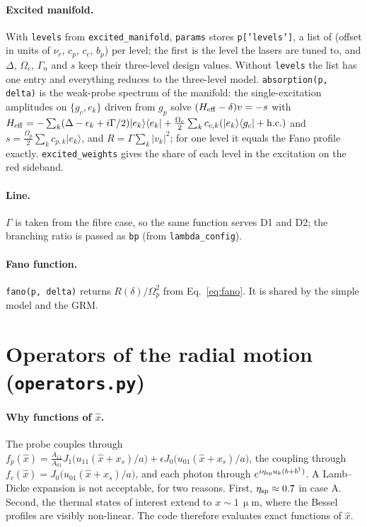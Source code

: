 \documentclass[11pt,a4paper]{article}
\newcommand{\ket}[1]{|#1\rangle}
\newcommand{\bra}[1]{\langle #1|}
\newcommand{\Om}{\Omega}
\newcommand{\code}[1]{\texttt{#1}}
\newcommand{\SI}[2]{\ensuremath{#1\,\mathrm{#2}}}
\begin{document}
\paragraph{Excited manifold.} With \code{levels} from \code{excited\_manifold}, \code{params} stores \code{p['levels']}, a list of (offset in units of $\nu_r$, $c_p$, $c_c$, $b_p$) per level; the first is the level the lasers are tuned to, and $\Delta$, $\Om_c$, $\Gamma_n$ and $s$ keep their three-level design values. Without \code{levels} the list has one entry and everything reduces to the three-level model. \code{absorption(p, delta)} is the weak-probe spectrum of the manifold: the single-excitation amplitudes on $\{g_c,e_k\}$ driven from $g_p$ solve $(H_{\rm eff}-\delta)v=-s$ with $H_{\rm eff}=-\sum_k(\Delta-\epsilon_k+i\Gamma/2)\ket{e_k}\bra{e_k}+\tfrac{\Om_c}2\sum_kc_{c,k}(\ket{e_k}\bra{g_c}+{\rm h.c.})$ and $s=\tfrac{\Om_p}2\sum_kc_{p,k}\ket{e_k}$, and $R=\Gamma\sum_k|v_k|^2$; for one level it equals the Fano profile exactly. \code{excited\_weights} gives the share of each level in the excitation on the red sideband.

\paragraph{Line.} $\Gamma$ is taken from the fibre case, so the same function serves D1 and D2; the branching ratio is passed as \code{bp} (from \code{lambda\_config}).

\paragraph{Fano function.} \code{fano(p, delta)} returns $R(\delta)/\Om_p^2$ from Eq.~\eqref{eq:fano}. It is shared by the simple model and the GRM.

\section{Operators of the radial motion (\code{operators.py})}
\label{sec:ops}
\paragraph{Why functions of $\hat x$.} The probe couples through $f_p(\hat x)=\tfrac{A_{11}}{A_{01}}J_1\big(u_{11}(\hat x+x_s)/a\big)+\epsilon J_0\big(u_{01}(\hat x+x_s)/a\big)$, the coupling through $f_c(\hat x)=J_0\big(u_{01}(\hat x+x_s)/a\big)$, and each photon through $e^{i\eta_{\rm sp}u_k(b+b^\dagger)}$. A Lamb--Dicke expansion is not acceptable, for two reasons. First, $\eta_{\rm sp}\approx0.7$ in case A. Second, the thermal states of interest extend to $x\sim\SI{1}{\upmu m}$, where the Bessel profiles are visibly non-linear. The code therefore evaluates exact functions of $\hat x$.
\end{document}
